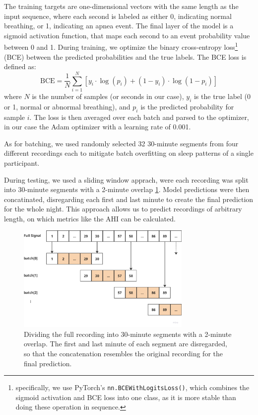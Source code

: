 The training targets are one-dimensional vectors with the same length as the input sequence, where each second is labeled as either 0, indicating normal breathing, or 1, indicating an apnea event. The final layer of the model is a sigmoid activation function, that maps each second to an event probability value between 0 and 1. During training, we optimize the binary cross-entropy loss\footnote{specifically, we use PyTorch's \texttt{nn.BCEWithLogitsLoss()}, which combines the sigmoid activation and BCE loss into one class, as it is more stable than doing these operation in sequence.} (BCE) between the predicted probabilities and the true labels. The BCE loss is defined as:
\begin{equation}
    \text{BCE} = \frac{1}{N}\sum_{i=1}^{N} [ y_i \cdot \log(p_i) + (1 - y_i) \cdot \log(1 - p_i) ]
\end{equation}
where $N$ is the number of samples (or seconds in our case), $y_i$ is the true label (0 or 1, normal or abnormal breathing), and $p_i$ is the predicted probability for sample $i$. The loss is then averaged over each batch and parsed to the optimizer, in our case the Adam optimizer with a learning rate of 0.001.

As for batching, we used randomly selected 32 30-minute segments from four different recordings each to mitigate batch overfitting on sleep patterns of a single participant.

During testing, we used a sliding window apprach, were each recording was split into 30-minute segments with a 2-minute overlap \ref{fig:slidingwindow}. Model predictions were then concatinated, disregarding each first and last minute to create the final prediction for the whole night. This approach allows us to predict recordings of arbitrary length, on which metrics like the AHI can be calculated.

\begin{figure}
    \centering
    \includegraphics[width=0.75\textwidth]{images/SlidingWindow}
    \caption{Dividing the full recording into 30-minute segments with a 2-minute overlap. The first and last minute of each segment are disregarded, so that the concatenation resembles the original recording for the final prediction.}
    \label{fig:slidingwindow}
\end{figure}

